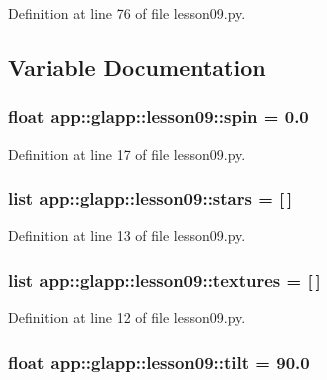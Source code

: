 Definition at line 76 of file lesson09.py.

\subsection{Variable Documentation}
\subsubsection{\setlength{\rightskip}{0pt plus 5cm}float {\bf app::glapp::lesson09::spin} = 0.0\hspace{0.3cm}{\tt  [static]}}\label{namespaceapp_1_1glapp_1_1lesson09_fb48fed11d03d2b9d12bb8e3754b5b21}




Definition at line 17 of file lesson09.py.
\subsubsection{\setlength{\rightskip}{0pt plus 5cm}list {\bf app::glapp::lesson09::stars} = [$\,$]\hspace{0.3cm}{\tt  [static]}}\label{namespaceapp_1_1glapp_1_1lesson09_64cae55fccb15a0365b45be7040b4f13}




Definition at line 13 of file lesson09.py.
\subsubsection{\setlength{\rightskip}{0pt plus 5cm}list {\bf app::glapp::lesson09::textures} = [$\,$]\hspace{0.3cm}{\tt  [static]}}\label{namespaceapp_1_1glapp_1_1lesson09_944e7a720c9fab49765df4c5367561fd}




Definition at line 12 of file lesson09.py.
\subsubsection{\setlength{\rightskip}{0pt plus 5cm}float {\bf app::glapp::lesson09::tilt} = 90.0\hspace{0.3cm}{\tt  [static]}}\label{namespaceapp_1_1glapp_1_1lesson09_9b5972e7e24e6b022181aad206057f7c}




